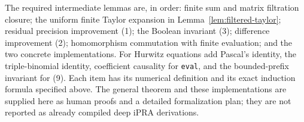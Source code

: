 The required intermediate lemmas are, in order: finite sum and matrix
filtration closure; the uniform finite Taylor expansion in
Lemma~\ref{lem:filtered-taylor}; residual precision improvement (1);
the Boolean invariant (3); difference improvement (2); homomorphism
commutation with finite evaluation; and the two concrete implementations.
For Hurwitz equations add Pascal's identity, the triple-binomial identity,
coefficient causality for \texttt{eval}, and the bounded-prefix invariant
for (9).  Each item has its numerical definition and its exact induction
formula specified above.  The general theorem and these implementations
are supplied here as human proofs and a detailed formalization plan;
they are not reported as already compiled deep iPRA derivations.
